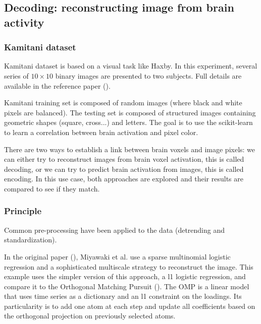 \documentclass{frontiersSCNS} %
\newcommand{\alex}[1]{\todo[inline, color=green!40]{#1}}
\begin{document}


\subsection{Decoding: reconstructing image from brain activity}

\subsubsection{Kamitani dataset}

Kamitani dataset is based on a visual task like Haxby. In this experiment,
several series of $10\times10$ binary images are presented to two subjects.
Full details are available in the reference paper
(\cite{miyawaki2008}).

Kamitani training set is composed of random images (where black and white pixels
are balanced). The testing set is composed of structured images containing
geometric shapes (square, cross...) and letters. The goal is to use the
scikit-learn to learn a correlation between brain
activation and pixel color. 

There are two ways to establish a link between brain voxels and image pixels: we
can either try to reconstruct images from brain voxel activation, this is called
decoding, or we can try to predict brain activation from images, this is called
encoding. In this use case, both approaches are explored and their results are
compared to see if they match. 

\subsubsection{Principle} %

Common pre-processing have been applied to the data (detrending and
standardization).

In the original paper (\cite{miyawaki2008}), Miyawaki et al. use a sparse multinomial
logistic regression and a sophisticated multiscale strategy to reconstruct the image.
This example uses the simpler version of this approach, a l1 logistic
regression, and compare it to the Orthogonal
Matching Pursuit (\cite{mallat1993}). The OMP is a linear model that uses
time series as a dictionary and an l1 constraint on the loadings. Its
particularity is to add one atom at each step and update all coefficients
based on the orthogonal projection on previously selected atoms.
\end{document}
